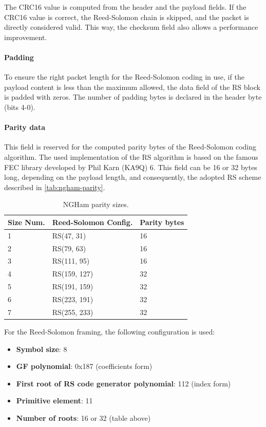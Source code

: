 The CRC16 value is computed from the header and the payload fields. If the CRC16 value is correct, the Reed-Solomon chain is skipped, and the packet is directly considered valid. This way, the checksum field also allows a performance improvement.

\paragraph{Padding}

To ensure the right packet length for the Reed-Solomon coding in use, if the payload content is less than the maximum allowed, the data field of the RS block is padded with zeros. The number of padding bytes is declared in the header byte (bits 4-0).

\paragraph{Parity data}

This field is reserved for the computed parity bytes of the Reed-Solomon coding algorithm. The used implementation of the RS algorithm is based on the famous FEC library developed by Phil Karn (KA9Q) 6. This field can be 16 or 32 bytes long, depending on the payload length, and consequently, the adopted RS scheme described in \autoref{tab:ngham-parity}.

\begin{table}[!ht]
    \centering
    \begin{tabular}{lll}
        \toprule[1.5pt]
        \textbf{Size Num.} & \textbf{Reed-Solomon Config.} & \textbf{Parity bytes} \\
        \midrule
        1 & RS(47, 31)   & 16 \\
        2 & RS(79, 63)   & 16 \\
        3 & RS(111, 95)  & 16 \\
        4 & RS(159, 127) & 32 \\
        5 & RS(191, 159) & 32 \\
        6 & RS(223, 191) & 32 \\
        7 & RS(255, 233) & 32 \\
        \bottomrule[1.5pt]
    \end{tabular}
    \caption{NGHam parity sizes.}
    \label{tab:ngham-parity}
\end{table}

For the Reed-Solomon framing, the following configuration is used:

\begin{itemize}
    \item \textbf{Symbol size}: 8
    \item \textbf{GF polynomial}: 0x187 (coefficients form)
    \item \textbf{First root of RS code generator polynomial}: 112 (index form)
    \item \textbf{Primitive element}: 11
    \item \textbf{Number of roots}: 16 or 32 (table above)
\end{itemize}

